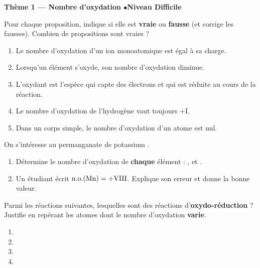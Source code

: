 \documentclass[11pt,a4paper]{article}
\begin{document}
\begin{center}\color{primarydark}\large\bfseries Thème 1 — Nombre d'oxydation \quad$\bullet$\quad Niveau Difficile\end{center}

\begin{exo}
Pour chaque proposition, indique si elle est \textbf{vraie} ou \textbf{fausse} (et corrige les
fausses). Combien de propositions sont vraies ?
\begin{enumerate}[label=\alph*)]
  \item Le nombre d'oxydation d'un ion monoatomique est égal à sa charge.
  \item Lorsqu'un élément s'oxyde, son nombre d'oxydation diminue.
  \item L'oxydant est l'espèce qui capte des électrons et qui est réduite au cours de la réaction.
  \item Le nombre d'oxydation de l'hydrogène vaut toujours $+\mathrm{I}$.
  \item Dans un corps simple, le nombre d'oxydation d'un atome est nul.
\end{enumerate}
\end{exo}

\begin{exo}
On s'intéresse au permanganate de potassium .
\begin{enumerate}[label=\alph*)]
  \item Détermine le nombre d'oxydation de \textbf{chaque} élément : ,  et .
  \item Un étudiant écrit $\mathrm{n.o.}(\ce{Mn})=+\mathrm{VIII}$. Explique son erreur et donne la
        bonne valeur.
\end{enumerate}
\end{exo}

\begin{exo}
Parmi les réactions suivantes, lesquelles sont des réactions d'\textbf{oxydo-réduction} ? Justifie en
repérant les atomes dont le nombre d'oxydation \textbf{varie}.
\begin{enumerate}[label=\alph*)]
  \item {}
  \item {}
  \item {}
  \item {}
\end{enumerate}
\end{exo}
\end{document}
